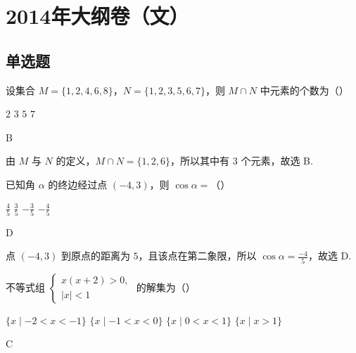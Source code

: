 \chapter{2014年大纲卷（文）}

\section{单选题}

\begin{problem}
设集合 \(M = \{1, 2, 4, 6, 8\}\)，\(N = \{1, 2, 3, 5, 6, 7\}\)，则 \(M \cap N\) 中元素的个数为（\quad）

\choices
    {\(2\)}
    {\(3\)}
    {\(5\)}
    {\(7\)}
\end{problem}

\begin{answer}
B
\end{answer}

\begin{solution}
由 \(M\) 与 \(N\) 的定义，\(M\cap N=\{1,2,6\}\)，所以其中有 \(3\) 个元素，故选 B.
\end{solution}

\begin{problem}
已知角 \(\alpha\) 的终边经过点 \((-4,3)\)，则 \(\cos \alpha =\)（\quad）

\choices
    {\( \frac{4}{5} \)}
    {\( \frac{3}{5} \)}
    {\(-\frac{3}{5}\)}
    {\(-\frac{4}{5}\)}
\end{problem}

\begin{answer}
D
\end{answer}

\begin{solution}
点 \((-4,3)\) 到原点的距离为 \(5\)，且该点在第二象限，所以
\(\cos\alpha=\frac{-4}{5}\)，故选 D.
\end{solution}

\begin{problem}
不等式组 \(
\begin{cases}
x(x + 2) > 0, \\
|x| < 1
\end{cases}
\) 的解集为（\quad）

\choices
    {\( \{x \mid -2 < x < -1\} \)}
    {\(\{x\mid -1 < x < 0\}\)}
    {\( \{x \mid 0 < x < 1\} \)}
    {\( \{x \mid x > 1\} \)}
\end{problem}

\begin{answer}
C
\end{answer}

